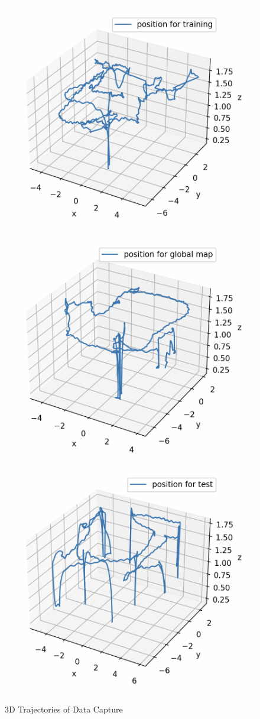 \begin{figure}[H]
    \centering
    \includegraphics[width=.3\linewidth]{Pictures/mapping/gt_train.png}\hfill
    \includegraphics[width=.3\linewidth]{Pictures/mapping/gt_global.png}\hfill
    \includegraphics[width=.3\linewidth]{Pictures/mapping/gt_test.png}
    \caption{3D Trajectories of Data Capture}
    \label{fig:gt_3d}
\end{figure}


